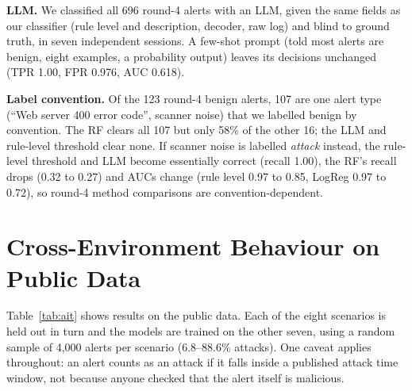 \documentclass[conference]{IEEEtran}
\begin{document}
\textbf{LLM.} We classified all 696 round-4 alerts with an LLM, given the same fields as our
classifier (rule level and description, decoder, raw log) and blind to ground truth, in seven
independent sessions. A few-shot prompt (told most alerts are benign, eight examples, a probability
output) leaves its decisions unchanged (TPR 1.00, FPR 0.976, AUC 0.618).

\textbf{Label convention.} Of the 123 round-4 benign alerts, 107 are one alert type (``Web server
400 error code'', scanner noise) that we labelled benign by convention. The RF clears all 107 but only 58\% of the other 16; the LLM and rule-level threshold clear none. If scanner
noise is labelled \emph{attack} instead, the rule-level threshold and LLM become essentially
correct (recall 1.00), the RF's recall drops (0.32 to 0.27) and AUCs change (rule level 0.97 to
0.85, LogReg 0.97 to 0.72), so round-4 method comparisons are convention-dependent.

\section{Cross-Environment Behaviour on Public Data}

\label{sec:ait}

Table~\ref{tab:ait} shows results on the public data. Each of the eight scenarios is held out in
turn and the models are trained on the other seven, using a random sample of 4,000 alerts per
scenario (6.8--88.6\% attacks). One caveat applies throughout: an alert counts as an attack if it falls inside a published attack time window, not
because anyone checked that the alert itself is malicious.

\begin{table}[!h]
\centering
\caption{AIT-ADS, mean over 8 held-out scenarios. ``Transfer'': threshold from out-of-fold
training scores for 95\% recall. ``+20'': re-thresholded with 20 labelled target alerts.}
\label{tab:ait}
\end{table}
\end{document}
